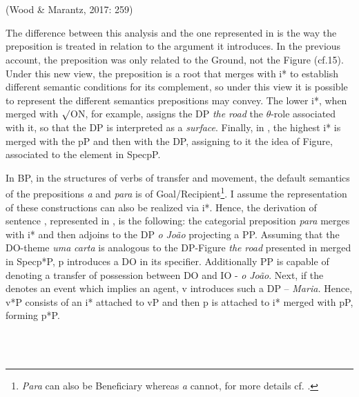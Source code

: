 \documentclass[output=paper,modfonts,nonflat]{langsci/langscibook}
\begin{document}
\ea%
    \label{ex:key:17}
    \gll\\
        \\
    \glt
    \z

         

 (Wood \& Marantz, 2017: 259)

The difference between this analysis and the one represented in  is the way the preposition is treated in relation to the argument it introduces. In the previous account, the preposition was only related to the Ground, not the Figure (cf.15). Under this new view, the preposition is a root that merges with i* to establish different semantic conditions for its complement, so under this view it is possible to represent the different semantics prepositions may convey. The lower i*, when merged with ${\surd}$ON, for example, assigns the DP \textit{the} \textit{road} the ${\theta}${}-role associated with it, so that the DP is interpreted as a \textit{surface}. Finally, in , the highest i* is merged with the pP and then with the DP, assigning to it the idea of Figure, associated to the element in SpecpP. 

In BP, in the structures of verbs of transfer and movement, the default semantics of the prepositions \textit{a} and \textit{para} is of Goal/Recipient\footnote{\textrm{\textit{Para}} \textrm{can also be Beneficiary}\textrm{ }\textrm{whereas} \textrm{\textit{a}} \textrm{cannot, for more details cf. \citet{Calindro2015}.}}. I assume the representation of these constructions can also be realized via i*. Hence, the derivation of sentence , represented in , is the following: the categorial preposition \textit{para} merges with i* and then adjoins to the DP  \textit{o} \textit{João} projecting a PP. Assuming that the DO-theme \textit{uma} \textit{carta} is analogous to the DP-Figure \textit{the} \textit{road} presented in  merged in Specp*P, p introduces a DO in its specifier. Additionally PP is capable of denoting a transfer of possession between DO and IO - \textit{o} \textit{João}. Next, if the denotes an event which implies an agent, v introduces such a DP – \textit{Maria.} Hence, v*P consists of an i* attached to vP and then p is attached to i* merged with pP, forming p*P.

 

\ea%
    \label{ex:key:18}
    \gll\\
        \\
    \glt
    \z
\end{document}
